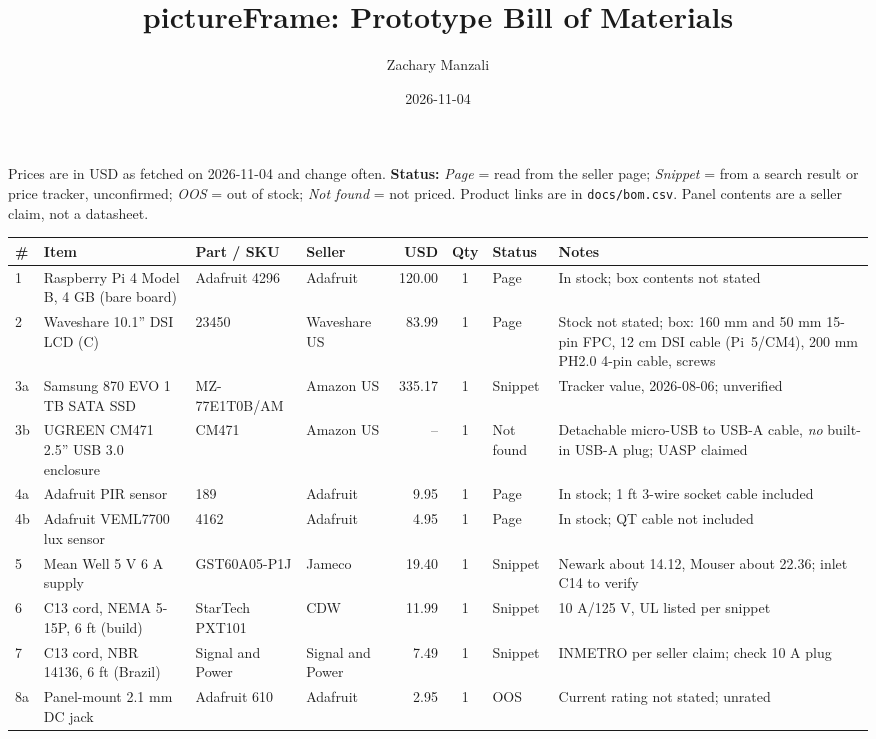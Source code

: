 \documentclass[10pt,a4paper]{article}
\title{pictureFrame: Prototype Bill of Materials}
\author{Zachary Manzali}
\date{2026-11-04}
\begin{document}
\maketitle

Prices are in USD as fetched on 2026-11-04 and change often. \textbf{Status:} \emph{Page} = read from the seller page; \emph{Snippet} = from a search result or price tracker, unconfirmed; \emph{OOS} = out of stock; \emph{Not found} = not priced. Product links are in \texttt{docs/bom.csv}. Panel contents are a seller claim, not a datasheet.

\begin{longtable}{l p{5.4cm} p{3.6cm} p{2.6cm} r c l p{5.6cm}}
\toprule
\textbf{\#} & \textbf{Item} & \textbf{Part / SKU} & \textbf{Seller} & \textbf{USD} & \textbf{Qty} & \textbf{Status} & \textbf{Notes} \\
\midrule\endhead
1 & Raspberry Pi 4 Model B, 4 GB (bare board) & Adafruit 4296 & Adafruit & 120.00 & 1 & Page & In stock; box contents not stated \\
2 & Waveshare 10.1'' DSI LCD (C) & 23450 & Waveshare US & 83.99 & 1 & Page & Stock not stated; box: 160 mm and 50 mm 15-pin FPC, 12 cm DSI cable (Pi~5/CM4), 200 mm PH2.0 4-pin cable, screws \\
3a & Samsung 870 EVO 1 TB SATA SSD & MZ-77E1T0B/AM & Amazon US & 335.17 & 1 & Snippet & Tracker value, 2026-08-06; unverified \\
3b & UGREEN CM471 2.5'' USB 3.0 enclosure & CM471 & Amazon US & -- & 1 & Not found & Detachable micro-USB to USB-A cable, \emph{no} built-in USB-A plug; UASP claimed \\
4a & Adafruit PIR sensor & 189 & Adafruit & 9.95 & 1 & Page & In stock; 1 ft 3-wire socket cable included \\
4b & Adafruit VEML7700 lux sensor & 4162 & Adafruit & 4.95 & 1 & Page & In stock; QT cable not included \\
5 & Mean Well 5 V 6 A supply & GST60A05-P1J & Jameco & 19.40 & 1 & Snippet & Newark about 14.12, Mouser about 22.36; inlet C14 to verify \\
6 & C13 cord, NEMA 5-15P, 6 ft (build) & StarTech PXT101 & CDW & 11.99 & 1 & Snippet & 10 A/125 V, UL listed per snippet \\
7 & C13 cord, NBR 14136, 6 ft (Brazil) & Signal and Power & Signal and Power & 7.49 & 1 & Snippet & INMETRO per seller claim; check 10 A plug \\
8a & Panel-mount 2.1 mm DC jack & Adafruit 610 & Adafruit & 2.95 & 1 & OOS & Current rating not stated; unrated \\

\end{longtable}
\end{document}
